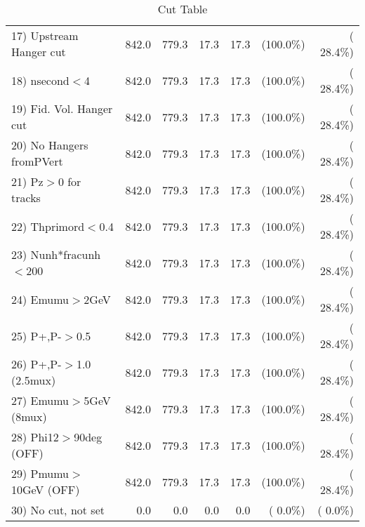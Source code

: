 \begin{table}[h!]
\begin{tabular}{||l||r|r|r|r|r|r||}
 17) Upstream Hanger cut  &        842.0 &        779.3 &         17.3 &         17.3 & (100.0\%) & ( 28.4\%) \\
 18) nsecond$<$4          &        842.0 &        779.3 &         17.3 &         17.3 & (100.0\%) & ( 28.4\%) \\
 19) Fid. Vol. Hanger cut &        842.0 &        779.3 &         17.3 &         17.3 & (100.0\%) & ( 28.4\%) \\
 20) No Hangers fromPVert &        842.0 &        779.3 &         17.3 &         17.3 & (100.0\%) & ( 28.4\%) \\
 21) Pz$>$0 for tracks    &        842.0 &        779.3 &         17.3 &         17.3 & (100.0\%) & ( 28.4\%) \\
 22) Thprimord$<$0.4      &        842.0 &        779.3 &         17.3 &         17.3 & (100.0\%) & ( 28.4\%) \\
 23) Nunh*fracunh$<$200   &        842.0 &        779.3 &         17.3 &         17.3 & (100.0\%) & ( 28.4\%) \\
 24) Emumu$>$2GeV         &        842.0 &        779.3 &         17.3 &         17.3 & (100.0\%) & ( 28.4\%) \\
 25) P+,P-$>$0.5          &        842.0 &        779.3 &         17.3 &         17.3 & (100.0\%) & ( 28.4\%) \\
 26) P+,P-$>$1.0 (2.5mux) &        842.0 &        779.3 &         17.3 &         17.3 & (100.0\%) & ( 28.4\%) \\
 27) Emumu$>$5GeV  (8mux) &        842.0 &        779.3 &         17.3 &         17.3 & (100.0\%) & ( 28.4\%) \\
 28) Phi12$>$90deg  (OFF) &        842.0 &        779.3 &         17.3 &         17.3 & (100.0\%) & ( 28.4\%) \\
 29) Pmumu$>$10GeV  (OFF) &        842.0 &        779.3 &         17.3 &         17.3 & (100.0\%) & ( 28.4\%) \\
 30) No cut, not set      &          0.0 &          0.0 &          0.0 &          0.0 & (  0.0\%) & (  0.0\%) \\
 \hline
 \hline
 \end{tabular}
 \caption{Cut Table           }
 \label{tab-cutheavy_neutrino_4.000}
 \end{table}
